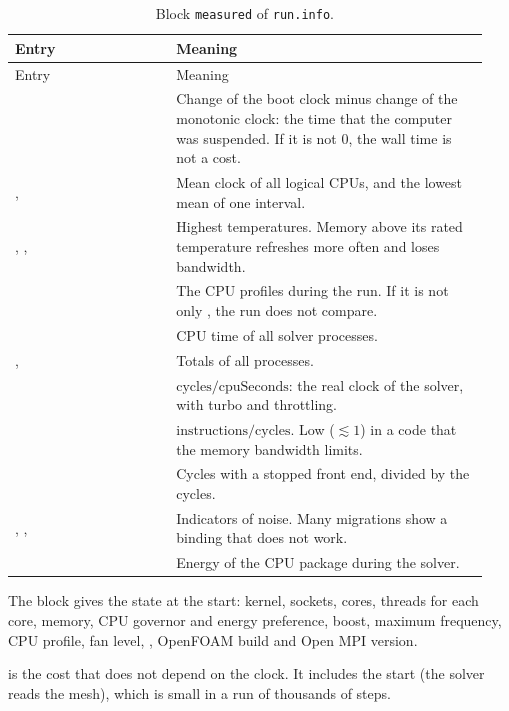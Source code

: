 \begin{longtable}{@{}P{0.32\linewidth} P{0.62\linewidth}@{}}
\caption{Block \texttt{measured} of \texttt{run.info}.}\label{tab:measured}\\
\toprule
Entry & Meaning \\
\midrule
\endfirsthead
\toprule
Entry & Meaning \\
\midrule
\endhead
{} & Change of the boot clock minus change of the monotonic clock: the time that the computer was suspended. If it is not 0, the wall time is not a cost. \\
,  & Mean clock of all logical CPUs, and the lowest mean of one interval. \\
, ,  & Highest temperatures. Memory above its rated temperature refreshes more often and loses bandwidth. \\
 & The CPU profiles during the run. If it is not only , the run does not compare. \\
 & CPU time of all solver processes. \\
,  & Totals of all processes. \\
 & $\text{cycles}/\text{cpuSeconds}$: the real clock of the solver, with turbo and throttling. \\
 & $\text{instructions}/\text{cycles}$. Low ($\lesssim 1$) in a code that the memory bandwidth limits. \\
 & Cycles with a stopped front end, divided by the cycles. \\
, ,  & Indicators of noise. Many migrations show a binding that does not work. \\
 & Energy of the CPU package during the solver. \\
\bottomrule
\end{longtable}

The block  gives the state at the start: kernel, sockets, cores, threads
for each core, memory, CPU governor and energy preference, boost, maximum frequency,
CPU profile, fan level, , OpenFOAM build and Open MPI version.

 is the cost that does not depend on the clock. It includes the
start (the solver reads the mesh), which is small in a run of thousands of steps.

